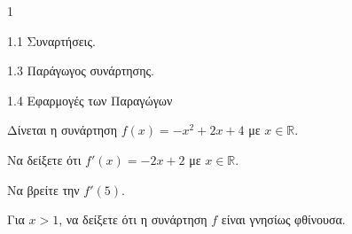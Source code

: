 \begin{ylh}{1}
    \item 1.1 Συναρτήσεις.
    \item 1.3 Παράγωγος συνάρτησης.
    \item 1.4 Εφαρμογές των Παραγώγων
\end{ylh}
Δίνεται η συνάρτηση $f(x)=-x^2+2x+4$ με $x \in \mathbb{R}$.
\begin{alist}
\item Να δείξετε ότι $f'(x)=-2x+2$ με $x \in \mathbb{R}$. 
\item Να βρείτε την $f'(5)$. 
\item Για $x>1$, να δείξετε ότι η συνάρτηση $f$ είναι γνησίως φθίνουσα. 
\end{alist}

